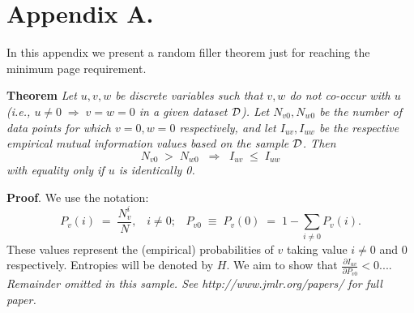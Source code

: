 \documentclass[twoside,11pt]{article}
\newcommand{\dataset}{{\cal D}}
\newcommand{\fracpartial}[2]{\frac{\partial #1}{\partial  #2}}
\begin{document}


\newpage

\appendix
\section*{Appendix A.}
\label{app:theorem}

In this appendix we present a random filler theorem just for reaching the minimum page requirement. 

\noindent
{\bf Theorem} {\it Let $u,v,w$ be discrete variables such that $v, w$ do
not co-occur with $u$ (i.e., $u\neq0\;\Rightarrow \;v=w=0$ in a given
dataset $\dataset$). Let $N_{v0},N_{w0}$ be the number of data points for
which $v=0, w=0$ respectively, and let $I_{uv},I_{uw}$ be the
respective empirical mutual information values based on the sample
$\dataset$. Then
\[
	N_{v0} \;>\; N_{w0}\;\;\Rightarrow\;\;I_{uv} \;\leq\;I_{uw}
\]
with equality only if $u$ is identically 0.} \hfill\BlackBox

\noindent
{\bf Proof}. We use the notation:
\[
P_v(i) \;=\;\frac{N_v^i}{N},\;\;\;i \neq 0;\;\;\;
P_{v0}\;\equiv\;P_v(0)\; = \;1 - \sum_{i\neq 0}P_v(i).
\]
These values represent the (empirical) probabilities of $v$
taking value $i\neq 0$ and 0 respectively.  Entropies will be denoted
by $H$. We aim to show that $\fracpartial{I_{uv}}{P_{v0}} < 0$....\\

{\noindent \em Remainder omitted in this sample. See http://www.jmlr.org/papers/ for full paper.}

\vskip 0.2in

\end{document}
